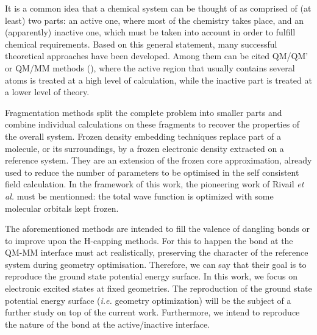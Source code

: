 \documentclass[12pt]{article}
\begin{document}
It is a common idea that a chemical system can be thought of as comprised of (at least) 
two parts:
an active one, where most of the chemistry takes place, and an (apparently) inactive
one, which must be taken into account in order to fulfill chemical requirements.
Based on this general statement, many successful theoretical approaches have been developed.
Among them can be cited QM/QM' or QM/MM methods (\showCustomItem), where 
the active region that usually contains several atoms is
treated at a high level of calculation, while the inactive part is treated at a 
lower level of theory.\cite{chung_oniom_2015,
ihrig_specific_2011,
zhang_pseudobond_1998,
dilabio_simple_2002,
dilabio_efficient_2005,
gao_generalized_1998,
assfeld_quantum_1996,
jacob_calculation_2006,
von_lilienfeld_variational_2004,
von_lilienfeld_performance_2005,
von_lilienfeld_optimization_2004,
goedecker_separable_1996,
hartwigsen_relativistic_1998,
singh_combined_1986,
zhang_pseudobond_1998-1,
zhang_improved_2004,
parks_pseudobond_2008,
dilabio_simple_2002-1,
hitzenberger_optimizing_2016,
hitzenberger_probing_2015,
collins_energy-based_2015,
pezeshki_recent_2015,
von_lilienfeld_force_2013}%

Fragmentation methods split the complete problem into smaller parts and combine individual calculations
on these fragments to recover the properties of the overall system.\cite{gordon_effective_2001,steinmann_effective_2012}
Frozen density embedding techniques replace part of a molecule, or 
its surroundings,
by a frozen electronic density extracted on a reference system.\cite{wesolowski_frozen-density_2015}
They are an extension of the frozen core approximation, already used to reduce
the number of parameters to be optimised in the self consistent field calculation.
In the framework of this work, the pioneering work of Rivail \emph{et al.} must be mentionned:
the total wave function is optimized with some molecular orbitals kept frozen.\cite{ASSFELD1996100}

The aforementioned methods are intended to fill the valence of dangling bonds
or to improve upon the H-capping methods. For this to happen the bond at the QM-MM interface must act realistically, preserving the character of the reference system during geometry optimisation. Therefore, we can say that their goal is to reproduce the ground state potential energy surface.
In this work, we focus on electronic excited states at fixed geometries.
The reproduction of the ground state potential energy surface (\emph{i.e.} geometry optimization) will be the subject of a further study on top of the current work.
Furthermore, we intend to reproduce the nature of the bond at the active/inactive interface.
\end{document}
